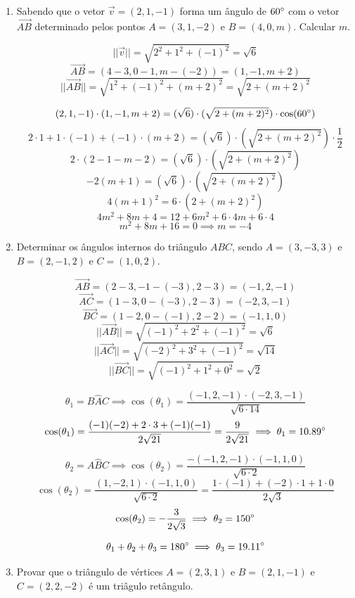 \documentclass[
  12pt,
  openright,
  a4paper,
  twoside,
  english,
  brazil,
]{article}
\begin{document}
\begin{enumerate}[\bfseries  1.]
  \item Sabendo que o vetor $\vec v = (2,1,-1)$ forma um ângulo de
    $60\degree$ com o vetor $\overrightarrow{AB}$ determinado pelos pontos
    $A=(3,1,-2)$ e $B=(4,0,m)$. Calcular $m$.

    $$
    ||\vec v||=\sqrt{2^2+1^2+(-1)^2}=\sqrt{6}
    $$
    $$
    \overrightarrow{AB}=(4-3,0-1,m-(-2))=(1,-1,m+2)
    $$
    $$
    ||\overrightarrow{AB}||=\sqrt{1^2+(-1)^2+(m+2)^2}=\sqrt{2+(m+2)^2}
    $$

    $$
    (2,1,-1)\cdot(1,-1,m+2)=(\sqrt 6)\cdot(\sqrt{2+(m+2)^2})\cdot
    \cos(60\degree)
    $$
    $$
    2\cdot 1+1\cdot(-1)+(-1)\cdot(m+2)=(\sqrt
    6)\cdot(\sqrt{2+(m+2)^2})\cdot \frac 1 2
    $$
    $$
    2\cdot(2-1-m-2)=(\sqrt6)\cdot(\sqrt{2+(m+2)^2})
    $$
    $$
    -2(m + 1)=(\sqrt6)\cdot(\sqrt{2+(m+2)^2})
    $$
    $$
    4(m + 1)^2=6\cdot(2+(m+2)^2)
    $$
    $$
    4m^2+8m+4=12+6m^2+6\cdot 4m+6\cdot 4
    $$
    $$
    m^2+8m+16=0\implies m=-4
    $$

  \item Determinar os ângulos internos do triângulo $ABC$, sendo
    $A=(3,-3,3)$ e $B=(2,-1,2)$ e $C=(1,0,2)$.

    $$
    \overrightarrow{AB}=(2-3,-1-(-3),2-3)=(-1,2,-1)
    $$
    $$
    \overrightarrow{AC}=(1-3,0-(-3),2-3)=(-2,3,-1)
    $$
    $$
    \overrightarrow{BC}=(1-2,0-(-1),2-2)=(-1,1,0)
    $$
    $$
    ||\overrightarrow{AB}||=\sqrt{(-1)^2+2^2+(-1)^2}=\sqrt 6
    $$
    $$
    ||\overrightarrow{AC}||=\sqrt{(-2)^2+3^2+(-1)^2}=\sqrt{14}
    $$
    $$
    ||\overrightarrow{BC}||=\sqrt{(-1)^2+1^2+0^2}=\sqrt{2}
    $$

    $$
    \theta_1= B\hat AC \implies
    \cos(\theta_1)=\frac{(-1,2,-1)\cdot(-2,3,-1)}{\sqrt{6\cdot 14}}
    $$
    $$
    \cos(\theta_1)=\frac{(-1)(-2)+2\cdot
    3+(-1)(-1)}{2\sqrt{21}}=\frac{9}{2\sqrt{21}}\implies \theta_1=10.89\degree
    $$

    $$
    \theta_2=A\hat BC\implies \cos(\theta_2)=\frac{-(-1,2,-1)\cdot
    (-1,1,0)}{\sqrt{6 \cdot 2}}
    $$
    $$
    \cos(\theta_2)=\frac{(1,-2,1)\cdot(-1,1,0)}{\sqrt{6 \cdot
    2}}=\frac{1\cdot(-1)+(-2)\cdot 1+1\cdot 0}{2\sqrt 3}
    $$
    $$
    \cos(\theta_2)=-\frac{3}{2\sqrt 3}\implies \theta_2=150\degree
    $$

    $$
    \theta_1+\theta_2+\theta_3=180\degree\implies \theta_3=19.11\degree
    $$

  \item Provar que o triângulo de vértices $A=(2,3,1)$ e $B=(2,1,-1)$
    e $C=(2,2,-2)$ é um triâgulo retângulo.


\end{enumerate}
\end{document}
